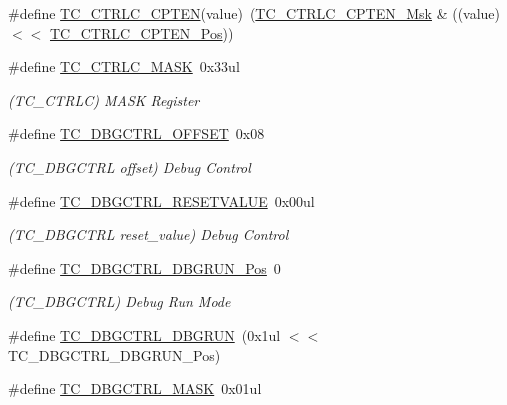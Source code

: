 \begin{DoxyCompactItemize}
\item 
\#define \mbox{\hyperlink{group___s_a_m_d21___t_c_gaaa8bac44fdf4302c0773c8dfce2f3894}{T\+C\+\_\+\+C\+T\+R\+L\+C\+\_\+\+C\+P\+T\+EN}}(value)~(\mbox{\hyperlink{group___s_a_m_d21___t_c_ga15f110683a1389fa83f4e4183bc05c91}{T\+C\+\_\+\+C\+T\+R\+L\+C\+\_\+\+C\+P\+T\+E\+N\+\_\+\+Msk}} \& ((value) $<$$<$ \mbox{\hyperlink{group___s_a_m_d21___t_c_gaef3ed0d7721db6fb8ecf185a7f0a058e}{T\+C\+\_\+\+C\+T\+R\+L\+C\+\_\+\+C\+P\+T\+E\+N\+\_\+\+Pos}}))
\item 
\#define \mbox{\hyperlink{group___s_a_m_d21___t_c_gaf2b908554462dd117e236f9fd7981e57}{T\+C\+\_\+\+C\+T\+R\+L\+C\+\_\+\+M\+A\+SK}}~0x33ul
\begin{DoxyCompactList}\small\item\em (T\+C\+\_\+\+C\+T\+R\+LC) M\+A\+SK Register \end{DoxyCompactList}\item 
\#define \mbox{\hyperlink{group___s_a_m_d21___t_c_ga2519e4270cc362a5fb2afddb488077ad}{T\+C\+\_\+\+D\+B\+G\+C\+T\+R\+L\+\_\+\+O\+F\+F\+S\+ET}}~0x08
\begin{DoxyCompactList}\small\item\em (T\+C\+\_\+\+D\+B\+G\+C\+T\+RL offset) Debug Control \end{DoxyCompactList}\item 
\#define \mbox{\hyperlink{group___s_a_m_d21___t_c_ga0aebb90c97a63ac996a5221ee58ec320}{T\+C\+\_\+\+D\+B\+G\+C\+T\+R\+L\+\_\+\+R\+E\+S\+E\+T\+V\+A\+L\+UE}}~0x00ul
\begin{DoxyCompactList}\small\item\em (T\+C\+\_\+\+D\+B\+G\+C\+T\+RL reset\+\_\+value) Debug Control \end{DoxyCompactList}\item 
\#define \mbox{\hyperlink{group___s_a_m_d21___t_c_gaaf3fdc9dbb422f406b9238a4ee2100a6}{T\+C\+\_\+\+D\+B\+G\+C\+T\+R\+L\+\_\+\+D\+B\+G\+R\+U\+N\+\_\+\+Pos}}~0
\begin{DoxyCompactList}\small\item\em (T\+C\+\_\+\+D\+B\+G\+C\+T\+RL) Debug Run Mode \end{DoxyCompactList}\item 
\#define \mbox{\hyperlink{group___s_a_m_d21___t_c_gad29a80ca0b9ccb69c8f1d4207d95bfea}{T\+C\+\_\+\+D\+B\+G\+C\+T\+R\+L\+\_\+\+D\+B\+G\+R\+UN}}~(0x1ul $<$$<$ T\+C\+\_\+\+D\+B\+G\+C\+T\+R\+L\+\_\+\+D\+B\+G\+R\+U\+N\+\_\+\+Pos)
\item 
\#define \mbox{\hyperlink{group___s_a_m_d21___t_c_ga38efec6f84caeb2a285ce88314a6b320}{T\+C\+\_\+\+D\+B\+G\+C\+T\+R\+L\+\_\+\+M\+A\+SK}}~0x01ul

\end{DoxyCompactItemize}

